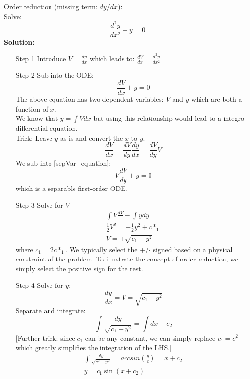 \begin{exmp}{Order reduction (missing term: $dy/dx$):}\\
Solve:
\begin{equation*}
\frac{d^2y}{dx^2}+y=0
\end{equation*}
\textbf{Solution:}\\
\begin{itemize}
\item[Step 1] Introduce $V= \frac{dy}{dx}$ which leads to: $\frac{dV}{dx}= \frac{d^2y}{dx^2}$ 
\item[Step 2]  Sub into the ODE:
\begin{equation}
\frac{dV}{dx}+y=0
\label{sepVar_equation}
\end{equation}
The above equation has two dependent variables: $V$ and $y$ which are both a function of $x$.\\
We know that $y=\int Vdx$ but using this relationship would lead to a integro-differential equation.\\
Trick: Leave $y$ as is and convert the $x$ to $y$.
\begin{equation*}
\boxed{\frac{dV}{dx}=\frac{dV}{dy}\frac{dy}{dx}=\frac{dV}{dy} V}
\end{equation*}
We sub into \eqref{sepVar_equation}:
\begin{equation}
V\frac{dV}{dy}+y=0
\end{equation}
which is a separable first-order ODE.
\item[Step 3] Solve for $V$
\begin{eqnarray}
\int V\frac{dV}=-\int y{dy} \\
\frac{1}{2}V^2=-\frac{1}{2}y^2 +c*_1\\
V=\pm \sqrt{c_1-y^2}
\end{eqnarray}
where $c_1=2c*_1$. We typically select the +/- signed based on a physical constraint of the problem. To illustrate the concept of order reduction, we simply select the positive sign for the rest.
\item[Step 4] Solve for $y$:
\begin{equation*}
\frac{dy}{dx}=V=\sqrt{c_1-y^2}
\end{equation*}
Separate and integrate:
\begin{equation*}
\int \frac{dy}{\sqrt{c_1-y^2}}=\int dx +c_2
\end{equation*}
[Further trick: since $c_1$ can be any constant, we can simply replace $c_1=c^2$ which greatly simplifies the integration of the LHS.]
\begin{eqnarray*}
\int \frac{dy}{\sqrt{c^2-y^2}}=arcsin\left(\frac{y}{c}\right)=x+c_2\\
\boxed{y=c_1\sin(x+c_2)}
\end{eqnarray*}
\end{itemize}
\end{exmp}


